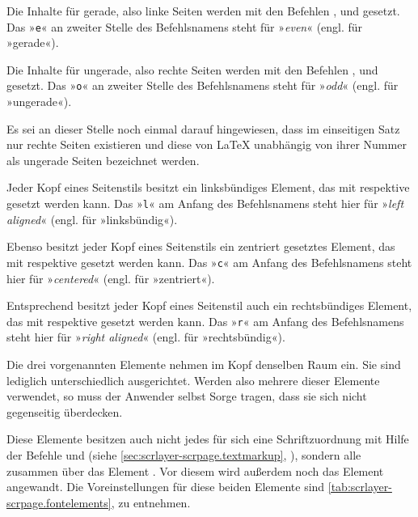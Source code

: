 Die Inhalte für gerade, also linke Seiten werden mit den
Befehlen ,  und  gesetzt. Das
»\texttt{e}« an zweiter Stelle des Befehlsnamens steht %
\iffalse dabei \fi %
für »\emph{even}« (engl. für »gerade«).

Die Inhalte für ungerade, also rechte Seiten werden mit
den Befehlen ,  und  gesetzt. Das
»\texttt{o}« an zweiter Stelle des Befehlsnamens steht %
\iffalse dabei \fi %
für »\emph{odd}« (engl. für »ungerade«).

Es sei an dieser Stelle noch einmal darauf hingewiesen,
dass im einseitigen Satz nur rechte Seiten existieren und diese von \LaTeX{}
unabhängig von ihrer Nummer als ungerade Seiten bezeichnet werden.

Jeder Kopf eines Seitenstils besitzt ein linksbündiges
Element, das mit  respektive  gesetzt werden
kann. Das »\texttt{l}« am Anfang des Befehlsnamens steht hier für »\emph{left
  aligned}« (engl. für »linksbündig«).

Ebenso besitzt jeder Kopf eines Seitenstils ein zentriert
gesetztes Element, das mit  respektive  gesetzt
werden kann. Das »\texttt{c}« am Anfang des Befehlsnamens steht hier für
»\emph{centered}« (engl. für »zentriert«).

Entsprechend besitzt jeder Kopf eines Seitenstil auch ein
rechtsbündiges Element, das mit 
respektive  gesetzt werden kann. Das »\texttt{r}« am Anfang des
Befehlsnamens steht hier für »\emph{right aligned}« (engl. für
»rechtsbündig«).

Die drei vorgenannten Elemente nehmen im Kopf denselben
Raum ein. Sie sind lediglich unterschiedlich ausgerichtet. Werden also mehrere
dieser Elemente verwendet, so muss der Anwender selbst Sorge tragen, dass sie
sich nicht gegenseitig überdecken.

\BeginIndexGroup
{}%
%
Diese Elemente besitzen auch nicht jedes für sich eine Schriftzuordnung mit
Hilfe der Befehle  und  (siehe
\autoref{sec:scrlayer-scrpage.textmarkup},
), sondern alle zusammen
über das Element . Vor
diesem wird außerdem noch das Element
angewandt. Die Voreinstellungen für diese beiden Elemente sind
\autoref{tab:scrlayer-scrpage.fontelements},
 zu entnehmen.%
\EndIndexGroup


